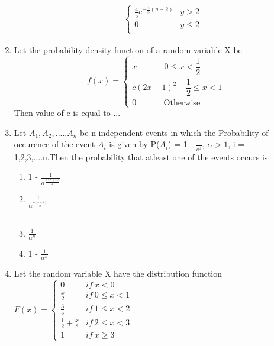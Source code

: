 \documentclass[journal,12pt,twocolumn]{IEEEtran}
\begin{document}
\begin{enumerate}
\begin{enumerate}
\begin{align*}
\begin{cases}
      \frac{4}{5}e^{-\frac{4}{5} (y-2)} & y > 2 \\
      0 & y \leq 2\\
   \end{cases} 
\end{align*} 
\end{enumerate}
%
\solution

%
\item    Let the probability density function of a random variable X be
   $$
   f(x)=
   \begin{cases}
   x~~~~~~~~~~~~~~~0\leqslant x < \dfrac{1}{2}\\
   c(2x-1)^2~~~~~\dfrac{1}{2}\leqslant x <1\\
   0 ~~~~~~~~~~~~~~~\text{Otherwise}
   \end{cases}
   $$
   Then value of c is equal to ...
   \\
\solution

%
\item Let $A_{1},A_{2},.....A_{n}$ be n independent events in which the Probability of occurence of the event $A_{i}$ is given by P($A_{i}$) = 1 - $\frac{1}{\alpha^i}$, $\alpha >1$, i = 1,2,3,....n.Then the probability that atleast one of the events occurs is
\begin{enumerate}
    \item  1 - $\frac{1}{\alpha^\frac{n(n+1)}{2}}$ \hspace{0.95cm}
    \item  $\frac{1}{\alpha^\frac{n(n+1)}{2}}$\hspace{1.5cm}
    \\ \\
    \item  $\frac{1}{\alpha^n}$ \hspace{2.15cm}
    \item 1 - $\frac{1}{\alpha^n}$\hspace{0.95cm}
  \end{enumerate}
  \solution
  
  \item Let the random variable X have the distribution function 
$F(x)= \begin{cases}
       0  & if \:x<0\\
       \frac{x}{2} & if\: 0 \le x <1\\
       \frac{3}{5} & if \:1 \le x <2\\
       \frac{1}{2} +\frac{x}{8} & if\: 2\le x <3\\
       1  & if\: x\ge 3
    \end{cases}$\\

\end{enumerate}
\end{document}
